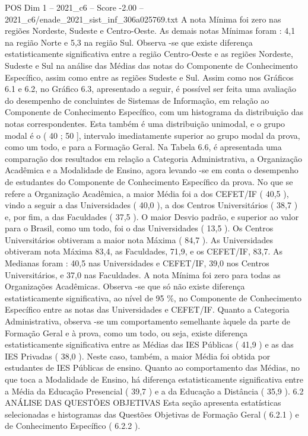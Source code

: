 \begin{textsample}{POS Dim 1 – 2021\_c6 – Score -2.00 – 2021\_c6/enade\_2021\_sist\_inf\_306a025769.txt}
A nota Mínima foi zero nas regiões Nordeste, Sudeste e Centro-Oeste.
As demais notas Mínimas foram : 4,1 na região Norte e 5,3 na região Sul.
Observa -se que existe diferença estatisticamente significativa entre a região Centro-Oeste e as regiões Nordeste, Sudeste e Sul na análise das Médias das notas do Componente de Conhecimento Específico, assim como entre as regiões Sudeste e Sul.
Assim como nos Gráficos 6.1 e 6.2, no Gráfico 6.3, apresentado a seguir, é possível ser feita uma avaliação do desempenho de concluintes de Sistemas de Informação, em relação ao Componente de Conhecimento Específico, com um histograma da distribuição das notas correspondentes.
Esta também é uma distribuição unimodal, e o grupo modal é o ( 40 ; 50 ], intervalo imediatamente superior ao grupo modal da prova, como um todo, e para a Formação Geral.
Na Tabela 6.6, é apresentada uma comparação dos resultados em relação a Categoria Administrativa, a Organização Acadêmica e a Modalidade de Ensino, agora levando -se em conta o desempenho de estudantes do Componente de Conhecimento Específico da prova.
No que se refere a Organização Acadêmica, a maior Média foi a dos CEFET/IF ( 40,5 ), vindo a seguir a das Universidades ( 40,0 ), a dos Centros Universitários ( 38,7 ) e, por fim, a das Faculdades ( 37,5 ).
O maior Desvio padrão, e superior ao valor para o Brasil, como um todo, foi o das Universidades ( 13,5 ).
Os Centros Universitários obtiveram a maior nota Máxima ( 84,7 ).
As Universidades obtiveram nota Máxima 83,4, as Faculdades, 71,9, e os CEFET/IF, 83,7.
As Medianas foram : 40,5 nas Universidades e CEFET/IF, 39,0 nos Centros Universitários, e 37,0 nas Faculdades.
A nota Mínima foi zero para todas as Organizações Acadêmicas.
Observa -se que só não existe diferença estatisticamente significativa, ao nível de 95 \%, no Componente de Conhecimento Específico entre as notas das Universidades e CEFET/IF.
Quanto a Categoria Administrativa, observa -se um comportamento semelhante àquele da parte de Formação Geral e à prova, como um todo, ou seja, existe diferença estatisticamente significativa entre as Médias das IES Públicas ( 41,9 ) e as das IES Privadas ( 38,0 ).
Neste caso, também, a maior Média foi obtida por estudantes de IES Públicas de ensino.
Quanto ao comportamento das Médias, no que toca a Modalidade de Ensino, há diferença estatisticamente significativa entre a Média da Educação Presencial ( 39,7 ) e a da Educação a Distância ( 35,9 ). 6.2 ANÁLISE DAS QUESTÕES OBJETIVAS Esta seção apresenta estatísticas selecionadas e histogramas das Questões Objetivas de Formação Geral ( 6.2.1 ) e de Conhecimento Específico ( 6.2.2 ).

\end{textsample}

